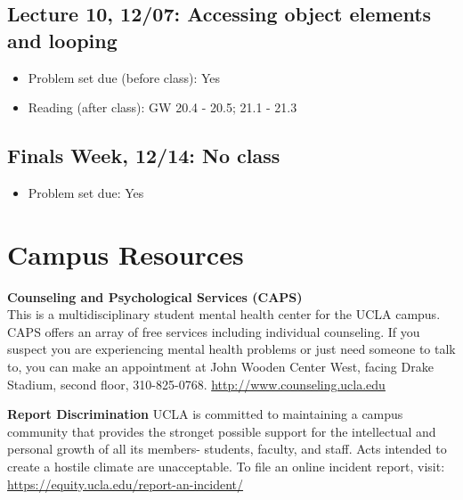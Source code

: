 \documentclass[11pt,]{article}
\providecommand{\tightlist}{%
  \setlength{\itemsep}{0pt}\setlength{\parskip}{0pt}}
\begin{document}
\subsection{Lecture 10, 12/07: Accessing object elements and
looping}\label{lecture-10-1207-accessing-object-elements-and-looping}

\begin{itemize}
\tightlist
\item
  Problem set due (before class): Yes
\item
  Reading (after class): GW 20.4 - 20.5; 21.1 - 21.3
\end{itemize}

\subsection{Finals Week, 12/14: No
class}\label{finals-week-1214-no-class}

\begin{itemize}
\tightlist
\item
  Problem set due: Yes
\end{itemize}

\section{Campus Resources}\label{campus-resources}

\textbf{Counseling and Psychological Services (CAPS)}\\
This is a multidisciplinary student mental health center for the UCLA
campus. CAPS offers an array of free services including individual
counseling. If you suspect you are experiencing mental health problems
or just need someone to talk to, you can make an appointment at John
Wooden Center West, facing Drake Stadium, second floor, 310-825-0768.
\url{http://www.counseling.ucla.edu}

\textbf{Report Discrimination} UCLA is committed to maintaining a campus
community that provides the stronget possible support for the
intellectual and personal growth of all its members- students, faculty,
and staff. Acts intended to create a hostile climate are unacceptable.
To file an online incident report, visit:
\url{https://equity.ucla.edu/report-an-incident/}
\end{document}
